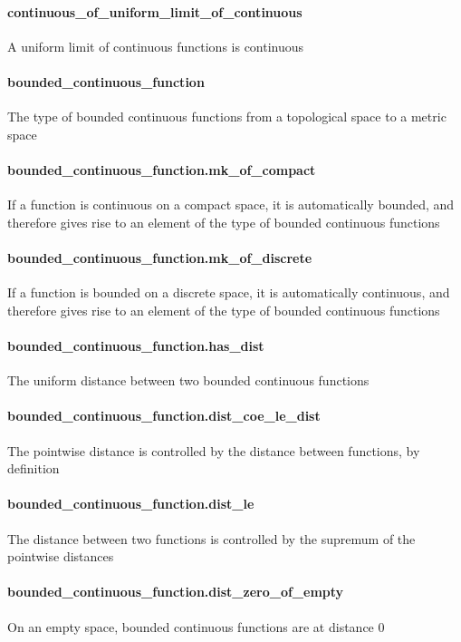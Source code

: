 \documentclass{article}
\begin{document}
\paragraph{continuous\_of\_uniform\_limit\_of\_continuous}
\par
A uniform limit of continuous functions is continuous
\paragraph{bounded\_continuous\_function}
\par
The type of bounded continuous functions from a topological space to a metric space
\paragraph{bounded\_continuous\_function.mk\_of\_compact}
\par
If a function is continuous on a compact space, it is automatically bounded,
and therefore gives rise to an element of the type of bounded continuous functions
\paragraph{bounded\_continuous\_function.mk\_of\_discrete}
\par
If a function is bounded on a discrete space, it is automatically continuous,
and therefore gives rise to an element of the type of bounded continuous functions
\paragraph{bounded\_continuous\_function.has\_dist}
\par
The uniform distance between two bounded continuous functions
\paragraph{bounded\_continuous\_function.dist\_coe\_le\_dist}
\par
The pointwise distance is controlled by the distance between functions, by definition
\paragraph{bounded\_continuous\_function.dist\_le}
\par
The distance between two functions is controlled by the supremum of the pointwise distances
\paragraph{bounded\_continuous\_function.dist\_zero\_of\_empty}
\par
On an empty space, bounded continuous functions are at distance 0
\end{document}
